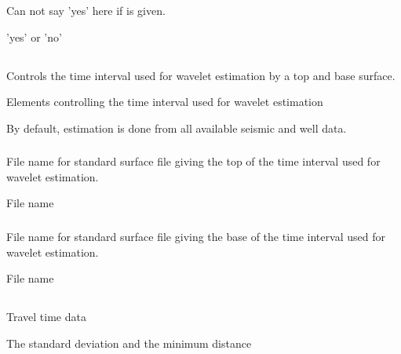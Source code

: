 \subsubsection{}
 \slist
   \item \Description Can not say 'yes' here if  is given.
   \item \Argument 'yes' or 'no'
   \item \Default
 \elist

\subsection{}
 \slist
   \item \Description Controls the time interval used for wavelet estimation by a top and base surface.
   \item \Argument Elements controlling the time interval used for wavelet estimation
   \item \Default By default, estimation is done from all available seismic and well data.
 \elist

\subsubsection{}
 \slist
   \item \Description File name for standard surface file giving the top of the time interval used for wavelet estimation.
   \item \Argument File name
   \item \Default
 \elist

\subsubsection{}
 \slist
   \item \Description File name for standard surface file giving the base of the time interval used for wavelet estimation.
   \item \Argument File name
   \item \Default
 \elist

\subsection{}
 \slist
   \item \Description Travel time data
   \item \Argument The standard deviation and the minimum distance
   \item \Default
 \elist

